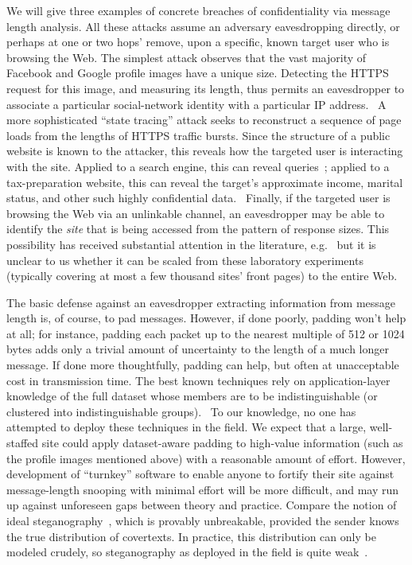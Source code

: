\documentclass[oneside]{zarticle}
\begin{document}
We will give three examples of concrete breaches of confidentiality
via message length analysis.  All these attacks assume an adversary
eavesdropping directly, or perhaps at one or two hops' remove, upon a
specific, known target user who is browsing the Web.  The simplest
attack observes that the vast majority of Facebook and Google profile
images have a unique size.  Detecting the HTTPS request for this
image, and measuring its length, thus permits an eavesdropper to
associate a particular social-network identity with a particular IP
address.~\cite{herrmann2012analyzing, pironti2012identifying} A more
sophisticated “state tracing” attack seeks to reconstruct a sequence
of page loads from the lengths of HTTPS traffic bursts.  Since the
structure of a public website is known to the attacker, this reveals
how the targeted user is interacting with the site.  Applied to a
search engine, this can reveal queries~\cite{castelluccia2010private};
applied to a tax-preparation website, this can reveal the target's
approximate income, marital status, and other such highly confidential
data.~\cite{zhang2010sidebuster} Finally, if the targeted user is
browsing the Web via an unlinkable channel, an eavesdropper may be
able to identify the \emph{site} that is being accessed from the
pattern of response sizes.  This possibility has received substantial
attention in the literature, e.g.~\cite{cai2012touching,
  cheng1998traffic, coull2007web, dyer2012peekaboo} but it is unclear
to us whether it can be scaled from these laboratory experiments
(typically covering at most a few thousand sites' front pages) to the
entire Web.

The basic defense against an eavesdropper extracting information from
message length is, of course, to pad messages.  However, if done
poorly, padding won't help at all; for instance, padding each packet
up to the nearest multiple of 512 or 1024 bytes adds only a trivial
amount of uncertainty to the length of a much longer message.  If done
more thoughtfully, padding can help, but often at unacceptable cost in
transmission time.  The best known techniques rely on
application-layer knowledge of the full dataset whose members are to
be indistinguishable (or clustered into indistinguishable
groups).~\cite{chen2010side, mather2012pinpointing,
  backes2013sidechannel} To our knowledge, no one has attempted to
deploy these techniques in the field.  We expect that a large,
well-staffed site could apply dataset-aware padding to high-value
information (such as the profile images mentioned above) with a
reasonable amount of effort.  However, development of “turnkey”
software to enable anyone to fortify their site against message-length
snooping with minimal effort will be more difficult, and may run up
against unforeseen gaps between theory and practice.  Compare the
notion of ideal steganography~\cite{hopper2009provably}, which is
provably unbreakable, provided the sender knows the true distribution
of covertexts.  In practice, this distribution can only be modeled
crudely, so steganography as deployed in the field is quite
weak~\cite{boehme2010steganalysis}.
\end{document}
